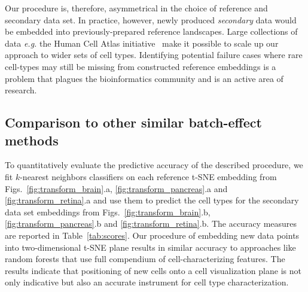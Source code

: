 \documentclass[runningheads]{llncs}
\begin{document}
Our procedure is, therefore, asymmetrical in the choice of reference and
secondary data set. In practice, however, newly produced {\em secondary} data
would be embedded into previously-prepared reference landscapes. Large
collections of data {\em e.g.} the Human Cell Atlas
initiative~\cite{Rozenblatt-Rosen2017} make it possible to scale up our approach
to wider sets of cell types. Identifying potential failure cases where rare
cell-types may still be missing from constructed reference embeddings is a
problem that plagues the bioinformatics community and is an active area of
research.


\subsection{Comparison to other similar batch-effect methods}

To quantitatively evaluate the predictive accuracy of the described procedure,
we fit $k$-nearest neighbors classifiers on each reference t-SNE embedding from
Figs.~\ref{fig:transform_brain}.a, \ref{fig:transform_pancreas}.a and
\ref{fig:transform_retina}.a and use them to predict the cell types for the
secondary data set embeddings from Figs.~\ref{fig:transform_brain}.b,
\ref{fig:transform_pancreas}.b and \ref{fig:transform_retina}.b. The accuracy
measures are reported in Table~\ref{tab:scores}. Our procedure of embedding new
data points into two-dimensional t-SNE plane results in similar accuracy to
approaches like random forests that use full compendium of cell-characterizing
features. The results indicate that positioning of new cells onto a cell
visualization plane is not only indicative but also an accurate instrument for
cell type characterization.
\end{document}
